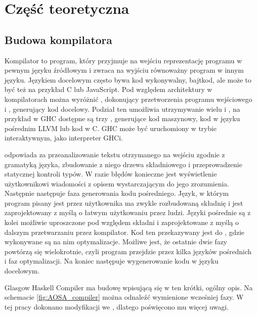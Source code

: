 \chapter{Część teoretyczna}\label{chap:teoria}

\section{Budowa kompilatora}\label{sec:budowa_kompilatora}

Kompilator to program, który przyjmuje na wejściu reprezentację programu w
pewnym języku źródłowym i zwraca na wyjściu równoważny program w innym
języku. Językiem docelowym często bywa kod wykonywalny, bajtkod, ale może to być
też na przykład C lub JavaScript. Pod względem architektury w kompilatorach
można wyróżnić , dokonujący przetworzenia programu wejściowego
i , generujący kod docelowy. Podział ten umożliwia utrzymywanie
wielu  i , na przykład w GHC dostępne są
trzy , generujące kod maszynowy, kod w języku pośrednim LLVM
lub kod w C\cite{AOSA}. GHC może być uruchomiony w trybie interaktywnym, jako
interpreter GHCi.

 odpowiada za przeanalizowanie tekstu otrzymanego na wejściu
zgodnie z gramatyką języka, zbudowanie z niego drzewa składniowego i
przeprowadzenie statycznej kontroli typów. W razie błędów konieczne jest
wyświetlenie użytkownikowi wiadomości z opisem wystarczającym do jego
zrozumienia. Następnie następuje faza generowania kodu pośredniego.
Język, w którym program pisany jest przez użytkownika ma zwykle rozbudowaną składnię i jest
zaprojektowany z myślą o łatwym użytkowaniu przez ludzi. Języki pośrednie są z
kolei możliwie uproszczone pod względem składni i zaprojektowane z myślą o
dalszym przetwarzaniu przez kompilator. Kod ten przekazywany jest do
, gdzie wykonywane są na nim optymalizacje. Możliwe jest, że
ostatnie dwie fazy powtórzą się wielokrotnie, czyli program przejdzie przez
kilka języków pośrednich i faz optymalizacji. Na koniec następuje wygenerowanie
kodu w języku docelowym\cite{Dragon}.

Glasgow Haskell Compiler ma budowę wpisującą się w ten krótki, ogólny opis. Na
schemacie \ref{fig:AOSA_compiler} można odnaleźć wymienione wcześniej fazy. W
tej pracy dokonano modyfikacji we , dlatego poświęcono mu
więcej uwagi.

